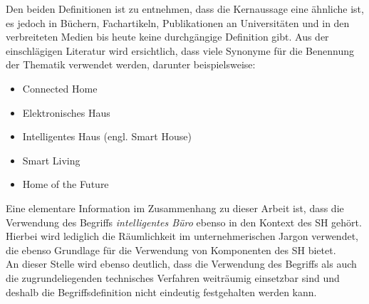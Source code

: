    Den beiden Definitionen ist zu entnehmen, dass die Kernaussage eine ähnliche ist, es jedoch in Büchern, Fachartikeln, 
    Publikationen an Universitäten und in den verbreiteten Medien bis heute keine durchgängige Definition gibt. Aus der
    einschlägigen Literatur wird ersichtlich, dass viele Synonyme für die Benennung der Thematik verwendet werden, darunter 
    beispielsweise: \cite{strese.2010m}
    \begin{itemize}
        \item Connected Home
        \item Elektronisches Haus
        \item Intelligentes Haus (engl. Smart House)
        \item Smart Living
        \item Home of the Future 
    \end{itemize}
    Eine elementare Information im Zusammenhang zu dieser Arbeit ist, dass die Verwendung des Begriffs \textit{intelligentes Büro} 
    ebenso in den Kontext des \acl{SH} gehört. Hierbei wird lediglich die Räumlichkeit im unternehmerischen Jargon verwendet, 
    die ebenso Grundlage für die Verwendung von Komponenten des \acl{SH} bietet. 
    \\
    An dieser Stelle wird ebenso deutlich, dass die Verwendung des Begriffs als auch die zugrundeliegenden technisches Verfahren 
    weiträumig einsetzbar sind und deshalb die Begriffsdefinition nicht eindeutig festgehalten werden kann. 
    
